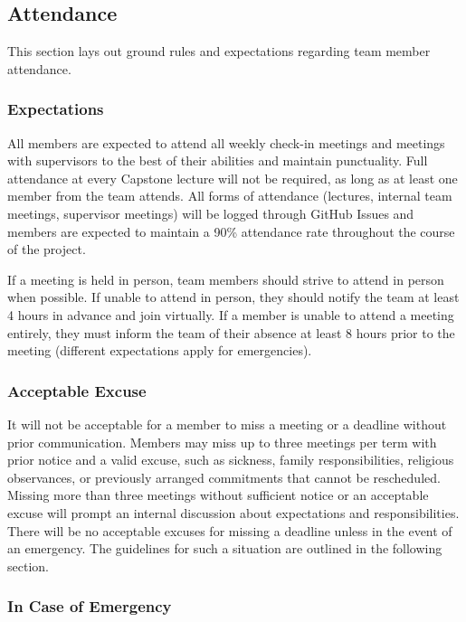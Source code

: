 \documentclass{article}
\begin{document}
\subsection*{Attendance}

This section lays out ground rules and expectations regarding team member
attendance.

\subsubsection*{Expectations}

All members are expected to attend all weekly check-in meetings and meetings
with supervisors to the best of their abilities and maintain punctuality. Full
attendance at every Capstone lecture will not be required, as long as at least
one member from the team attends. All forms of attendance (lectures, internal
team meetings, supervisor meetings) will be logged through GitHub Issues and
members are expected to maintain a 90\% attendance rate throughout the course of
the project.\newline

\noindent If a meeting is held in person, team members should strive to attend
in person when possible. If unable to attend in person, they should notify the
team at least 4 hours in advance and join virtually. If a member is unable to
attend a meeting entirely, they must inform the team of their absence at least 8
hours prior to the meeting (different expectations apply for emergencies).

\subsubsection*{Acceptable Excuse}

It will not be acceptable for a member to miss a meeting or a deadline without
prior communication. Members may miss up to three meetings per term with prior
notice and a valid excuse, such as sickness, family responsibilities, religious
observances, or previously arranged commitments that cannot be rescheduled.
Missing more than three meetings without sufficient notice or an acceptable
excuse will prompt an internal discussion about expectations and
responsibilities. There will be no acceptable excuses for missing a deadline
unless in the event of an emergency. The guidelines for such a situation are
outlined in the following section.

\subsubsection*{In Case of Emergency}
\end{document}
